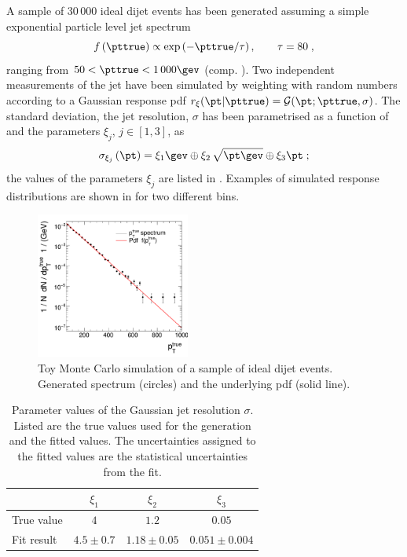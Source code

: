A sample of $30\,000$ ideal dijet events has been generated assuming a simple exponential particle level jet \pt spectrum
\begin{equation}
  \label{eq:ResFit:ToyMC:Spectrum}
  f\left(\pttrue\right) \propto \exp\left(-\pttrue / \tau\right),
  \qquad \tau = 80 \;,
\end{equation}
ranging from \mbox{$50 < \pttrue < 1\,000\gev$} (comp. ).
Two independent measurements of the jet \pt have been simulated by weighting \pttrue with random numbers according to a Gaussian response pdf \mbox{$r_{\mathbf{\xi}}(\pt|\pttrue) = \mathcal{G}(\pt;\pttrue,\sigma)$}.
The standard deviation, \ie the jet resolution, $\sigma$ has been parametrised as a function of \pttrue and the parameters $\xi_{j}$, \mbox{$j\in [1,3]$}, as
\begin{equation}
  \label{eq:ResFit:ToyMC:Sigma}
  \sigma_{\xi_{j}}\left(\pt\right) = \xi_{1}\gev \oplus \xi_{2}\,\sqrt{\pt\gev}\oplus \xi_{3}\pt \;;
\end{equation}
the values of the parameters $\xi_{j}$ are listed in .
Examples of simulated response distributions are shown in  for two different \pttrue bins.

\begin{figure}[ht]
  \centering
  \includegraphics[width=0.45\textwidth]{figures/resFit_ToyMC_PtGenCuts_SpectrumLog}
  \caption{Toy Monte Carlo simulation of a sample of ideal dijet events.
    Generated \pttrue spectrum (circles) and the underlying pdf (solid line).}
  \label{fig:ResFit:App:ToyMC:Spectrum}
\end{figure}

\begin{table}[ht]
  \caption{Parameter values of the Gaussian jet \pt resolution $\sigma$.
    Listed are the true values used for the generation and the fitted values.
    The uncertainties assigned to the fitted values are the statistical uncertainties from the fit.
    }
  \centering
  \begin{tabular}[ht]{lccc}
    \toprule
     & $\xi_{1}$ & $\xi_{2}$ & $\xi_{3}$ \\
    \midrule
    True value & $4$           & $1.2$           & $0.05$ \\
    Fit result & $4.5 \pm 0.7$ & $1.18 \pm 0.05$ & $0.051 \pm 0.004$ \\
    \bottomrule
  \end{tabular}
  \label{tab:ResFit:ToyMC:FitResult}
\end{table}

